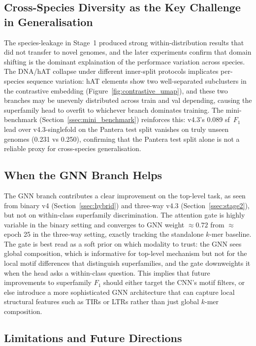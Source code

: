 \documentclass[12pt]{article}
\begin{document}
\subsection{Cross-Species Diversity as the Key Challenge in Generalisation}\label{ssec:disc_species_shift}

The species-leakage in Stage~1 produced strong within-distribution results that did not transfer to novel genomes, and the later experiments confirm that domain shifting is the dominant explaination of the performace variation across species. The DNA/hAT collapse under different inner-split protocols implicates per-species sequence variation: hAT elements show two well-separated subclusters in the contrastive embedding (Figure~\ref{fig:contrastive_umap}), and these two branches may be unevenly distributed across train and val depending, causing the superfamily head to overfit to whichever branch dominates training. The mini-benchmark (Section~\ref{ssec:mini_benchmark}) reinforces this: v4.3's 0.089 sf~$F_1$ lead over v4.3-singlefold on the Pantera test split vanishes on truly unseen genomes (0.231 vs 0.250), confirming that the Pantera test split alone is not a reliable proxy for cross-species generalisation. 

\subsection{When the GNN Branch Helps}\label{ssec:hybrid_disc}

The GNN branch contributes a clear improvement on the top-level task, as seen from binary v4 (Section~\ref{ssec:hybrid}) and three-way v4.3 (Section~\ref{ssec:stage2}), but not on within-class superfamily discrimination. The attention gate is highly variable in the binary setting and converges to GNN weight $\approx 0.72$ from $\approx$ epoch 25 in the three-way setting, exactly tracking the standalone $k$-mer baseline. The gate is best read as a soft prior on which modality to trust: the GNN sees global composition, which is informative for top-level mechanism but not for the local motif differences that distinguish superfamilies, and the gate downweights it when the head asks a within-class question. This implies that future improvements to superfamily $F_1$ should either target the CNN's motif filters, or else introduce a more sophisticated GNN architecture that can capture local structural features such as TIRs or LTRs rather than just global $k$-mer composition. 

\subsection{Limitations and Future Directions}\label{ssec:limitations}
\end{document}

